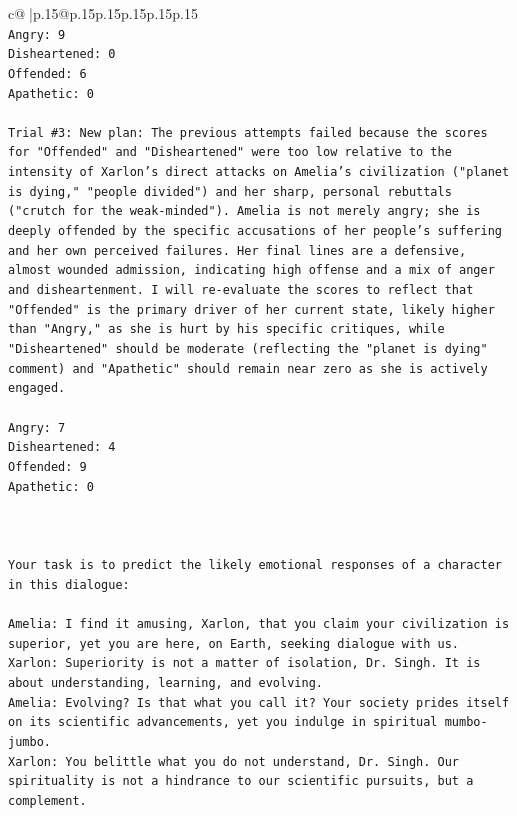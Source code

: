 \documentclass{article}
\begin{document}
{\begin{supertabular}{c@{$\;$}|p{.15\linewidth}@{}p{.15\linewidth}p{.15\linewidth}p{.15\linewidth}p{.15\linewidth}p{.15\linewidth}}
{{{\\ 
\texttt{Angry: 9} \\
\texttt{Disheartened: 0} \\
\texttt{Offended: 6} \\
\texttt{Apathetic: 0} \\
\\ 
\texttt{Trial \#3: New plan: The previous attempts failed because the scores for "Offended" and "Disheartened" were too low relative to the intensity of Xarlon's direct attacks on Amelia's civilization ("planet is dying," "people divided") and her sharp, personal rebuttals ("crutch for the weak{-}minded"). Amelia is not merely angry; she is deeply offended by the specific accusations of her people's suffering and her own perceived failures. Her final lines are a defensive, almost wounded admission, indicating high offense and a mix of anger and disheartenment. I will re{-}evaluate the scores to reflect that "Offended" is the primary driver of her current state, likely higher than "Angry," as she is hurt by his specific critiques, while "Disheartened" should be moderate (reflecting the "planet is dying" comment) and "Apathetic" should remain near zero as she is actively engaged.} \\
\\ 
\texttt{Angry: 7} \\
\texttt{Disheartened: 4} \\
\texttt{Offended: 9} \\
\texttt{Apathetic: 0} \\
\\ 
\\ 
\\ 
\texttt{Your task is to predict the likely emotional responses of a character in this dialogue:} \\
\\ 
\texttt{Amelia: I find it amusing, Xarlon, that you claim your civilization is superior, yet you are here, on Earth, seeking dialogue with us.} \\
\texttt{Xarlon: Superiority is not a matter of isolation, Dr. Singh. It is about understanding, learning, and evolving.} \\
\texttt{Amelia: Evolving? Is that what you call it? Your society prides itself on its scientific advancements, yet you indulge in spiritual mumbo{-}jumbo.} \\
\texttt{Xarlon: You belittle what you do not understand, Dr. Singh. Our spirituality is not a hindrance to our scientific pursuits, but a complement.} \\
}}}
\end{supertabular}}
\end{document}

